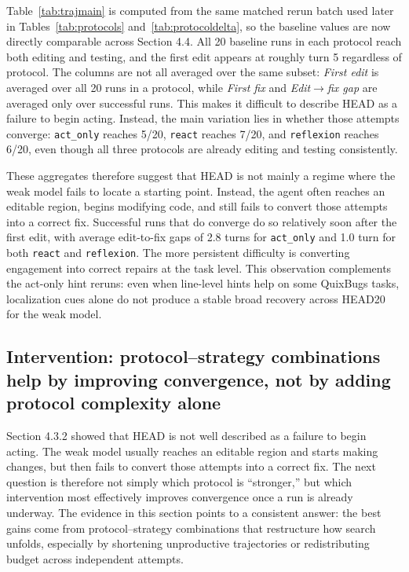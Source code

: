 \documentclass{article}
\begin{document}
Table~\ref{tab:trajmain} is computed from the same matched rerun batch used later in Tables~\ref{tab:protocols} and~\ref{tab:protocoldelta}, so the baseline values are now directly comparable across Section 4.4. All 20 baseline runs in each protocol reach both editing and testing, and the first edit appears at roughly turn 5 regardless of protocol. The columns are not all averaged over the same subset: \textit{First edit} is averaged over all 20 runs in a protocol, while \textit{First fix} and \textit{Edit$\rightarrow$fix gap} are averaged only over successful runs. This makes it difficult to describe HEAD as a failure to begin acting. Instead, the main variation lies in whether those attempts converge: \texttt{act\_only} reaches 5/20, \texttt{react} reaches 7/20, and \texttt{reflexion} reaches 6/20, even though all three protocols are already editing and testing consistently.

These aggregates therefore suggest that HEAD is not mainly a regime where the weak model fails to locate a starting point. Instead, the agent often reaches an editable region, begins modifying code, and still fails to convert those attempts into a correct fix. Successful runs that do converge do so relatively soon after the first edit, with average edit-to-fix gaps of 2.8 turns for \texttt{act\_only} and 1.0 turn for both \texttt{react} and \texttt{reflexion}. The more persistent difficulty is converting engagement into correct repairs at the task level. This observation complements the act-only hint reruns: even when line-level hints help on some QuixBugs tasks, localization cues alone do not produce a stable broad recovery across HEAD20 for the weak model.

\subsection{Intervention: protocol--strategy combinations help by improving convergence, not by adding protocol complexity alone}

Section 4.3.2 showed that HEAD is not well described as a failure to begin acting. The weak model usually reaches an editable region and starts making changes, but then fails to convert those attempts into a correct fix. The next question is therefore not simply which protocol is ``stronger,'' but which intervention most effectively improves convergence once a run is already underway. The evidence in this section points to a consistent answer: the best gains come from protocol--strategy combinations that restructure how search unfolds, especially by shortening unproductive trajectories or redistributing budget across independent attempts.
\end{document}
